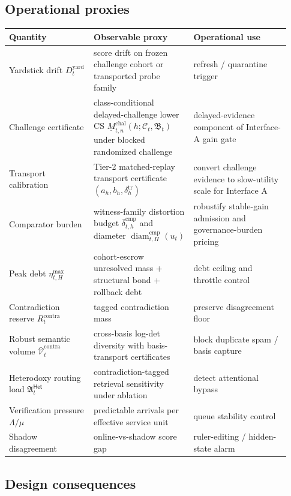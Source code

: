 \documentclass[11pt]{article}
\theoremstyle{definition}
\newcommand{\1}{\mathbf{1}}
\newcommand{\Het}{\mathsf{Het}}
\begin{document}
\subsection{Operational proxies}
\begin{center}
\begin{tabular}{p{0.28\linewidth}p{0.33\linewidth}p{0.32\linewidth}}
\toprule
Quantity & Observable proxy & Operational use \\
\midrule
Yardstick drift $D_t^{\mathrm{yard}}$ & score drift on frozen challenge cohort or transported probe family & refresh / quarantine trigger \\
Challenge certificate & class-conditional delayed-challenge lower CS $\underline M^{\mathrm{chal}}_{t,n}(h;\mathcal C_t,\mathfrak B_t)$ under blocked randomized challenge & delayed-evidence component of Interface-A gain gate \\
Transport calibration & Tier-2 matched-replay transport certificate $(a_h,b_h,\delta_h^{\mathrm{tr}})$ & convert challenge evidence to slow-utility scale for Interface A \\
Comparator burden & witness-family distortion budget $\bar\delta_{t,h}^{\mathrm{cmp}}$ and diameter $\operatorname{diam}^{\mathrm{cmp}}_{t,H}(u_t)$ & robustify stable-gain admission and governance-burden pricing \\
Peak debt $\eta_{t,H}^{\max}$ & cohort-escrow unresolved mass + structural bond + rollback debt & debt ceiling and throttle control \\
Contradiction reserve $R_t^{\mathrm{contra}}$ & tagged contradiction mass & preserve disagreement floor \\
Robust semantic volume $\bar{\mathcal V}_t^{\mathrm{contra}}$ & cross-basis log-det diversity with basis-transport certificates & block duplicate spam / basis capture \\
Heterodoxy routing load $\mathfrak A_t^{\Het}$ & contradiction-tagged retrieval sensitivity under ablation & detect attentional bypass \\
Verification pressure $\Lambda/\mu$ & predictable arrivals per effective service unit & queue stability control \\
Shadow disagreement & online-vs-shadow score gap & ruler-editing / hidden-state alarm \\
\bottomrule
\end{tabular}
\end{center}

\subsection{Design consequences}
\end{document}
